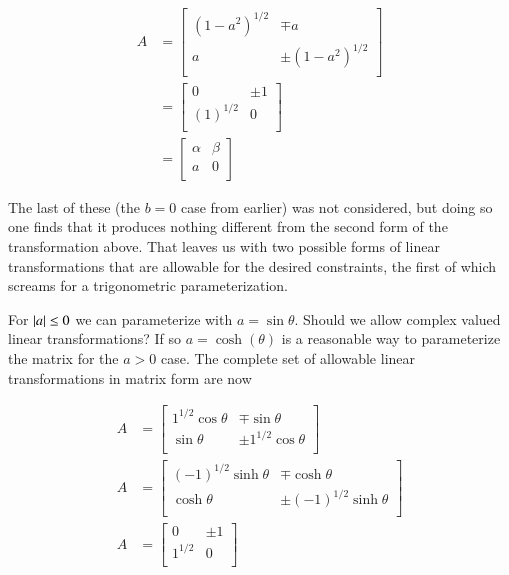 \begin{align}\label{eqn:quadratricForm:voo17}
A 
&= 
\begin{bmatrix}
(1 - a^2)^{1/2} & \mp a \\
a  & \pm (1 - a^2)^{1/2} \\
\end{bmatrix} \\
&= 
\begin{bmatrix}
0 & \pm 1 \\
(1)^{1/2} & 0 \\
\end{bmatrix} \\
&=
\begin{bmatrix}
\alpha & \beta \\
a & 0 \\
\end{bmatrix} 
\end{align}

The last of these (the $b=0$ case from earlier) was not considered, but doing so one finds that it produces nothing different from the second form of the transformation above.  That leaves us with two possible forms of linear transformations that are allowable for the desired constraints, the first of which screams for a trigonometric parameterization.

For $\left\lvert{a}\right\rvert \le 0$ we can parameterize with $a = \sin\theta$.  Should we allow complex valued linear transformations?  If so $a = \cosh(\theta)$ is a reasonable way to parameterize the matrix for the $a > 0$ case.  The complete set of allowable linear transformations in matrix form are now

\begin{align}\label{eqn:quadratricForm:voo18}
A &= 
\begin{bmatrix}
1^{1/2} \cos\theta & \mp \sin\theta \\
\sin\theta & \pm 1^{1/2} \cos\theta \\
\end{bmatrix} \\
A &= 
\begin{bmatrix}
(-1)^{1/2} \sinh\theta & \mp \cosh\theta \\
\cosh\theta  & \pm (-1)^{1/2} \sinh\theta \\
\end{bmatrix} \\
A &= 
\begin{bmatrix}
0 & \pm 1 \\
1^{1/2} & 0 \\
\end{bmatrix}
\end{align}

